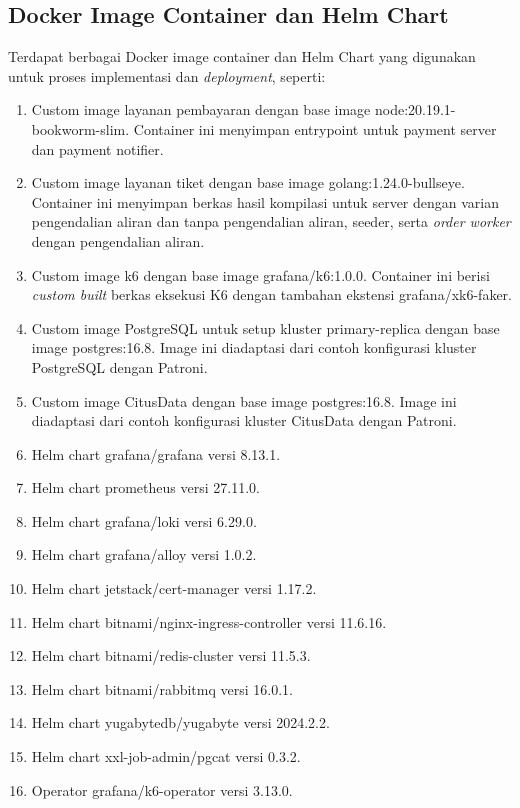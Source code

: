 \subsection{Docker Image Container dan Helm Chart}

Terdapat berbagai Docker image container dan Helm Chart yang digunakan untuk proses implementasi dan \textit{deployment}, seperti:

\begin{enumerate}
    \item Custom image layanan pembayaran dengan base image node:20.19.1-bookworm-slim. Container ini menyimpan entrypoint untuk payment server dan payment notifier.
    \item Custom image layanan tiket dengan base image golang:1.24.0-bullseye. Container ini menyimpan berkas hasil kompilasi untuk server dengan varian pengendalian aliran dan tanpa pengendalian aliran, seeder, serta \textit{order worker} dengan pengendalian aliran.
    \item Custom image k6 dengan base image grafana/k6:1.0.0. Container ini berisi \textit{custom built} berkas eksekusi K6 dengan tambahan ekstensi grafana/xk6-faker.
    \item Custom image PostgreSQL untuk setup kluster primary-replica dengan base image postgres:16.8. Image ini diadaptasi dari contoh konfigurasi kluster PostgreSQL dengan Patroni.
    \item Custom image CitusData dengan base image postgres:16.8. Image ini diadaptasi dari contoh konfigurasi kluster CitusData dengan Patroni.
    \item Helm chart grafana/grafana versi 8.13.1.
    \item Helm chart prometheus versi 27.11.0.
    \item Helm chart grafana/loki versi 6.29.0.
    \item Helm chart grafana/alloy versi 1.0.2.
    \item Helm chart jetstack/cert-manager versi 1.17.2.
    \item Helm chart bitnami/nginx-ingress-controller versi 11.6.16.
    \item Helm chart bitnami/redis-cluster versi 11.5.3.
    \item Helm chart bitnami/rabbitmq versi 16.0.1.
    \item Helm chart yugabytedb/yugabyte versi 2024.2.2.
    \item Helm chart xxl-job-admin/pgcat versi 0.3.2.
    \item Operator grafana/k6-operator versi 3.13.0.
\end{enumerate}